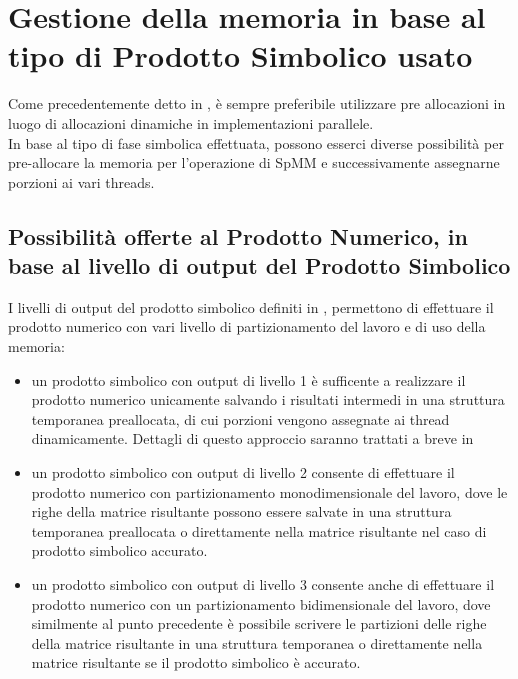 \section{Gestione della memoria in base al tipo di Prodotto Simbolico usato}
Come precedentemente detto in ,
è sempre preferibile utilizzare pre allocazioni in luogo di allocazioni dinamiche 
in implementazioni parallele.\\
In base al tipo di fase simbolica effettuata, possono esserci diverse possibilità per 
pre-allocare la memoria per l'operazione di SpMM e successivamente assegnarne 
porzioni ai vari threads.\\
\subsection[Possibilità offerte al Prodotto Numerico,\\in base al livello di output del Prodotto Simbolico]
{Possibilità offerte al Prodotto Numerico, in base al livello di output del Prodotto Simbolico}
\label{chSpMMNum:funcsMultiImplePurpose}
I livelli di output del prodotto simbolico definiti in , 
permettono di effettuare il prodotto numerico con vari livello di 
partizionamento del lavoro e di uso della memoria:
\begin{itemize}
	\item un prodotto simbolico con output di livello 1 è sufficente a realizzare 
		  il prodotto numerico unicamente salvando i risultati intermedi in una struttura temporanea preallocata,
		  di cui porzioni vengono assegnate ai thread dinamicamente.
		  Dettagli di questo approccio saranno trattati a breve in 
	\item un prodotto simbolico con output di livello 2 consente di effettuare il prodotto numerico
		  con partizionamento monodimensionale del lavoro, dove le righe della matrice risultante 
		  possono essere salvate in una struttura temporanea preallocata
		  o direttamente nella matrice risultante nel caso di prodotto simbolico accurato.
	\item un prodotto simbolico con output di livello 3 consente anche di effettuare il prodotto numerico
		  con un partizionamento bidimensionale del lavoro, dove similmente al punto precedente è possibile
		  scrivere le partizioni delle righe della matrice risultante 
		  in una struttura temporanea o direttamente nella matrice risultante se il prodotto simbolico è accurato.
\end{itemize}

